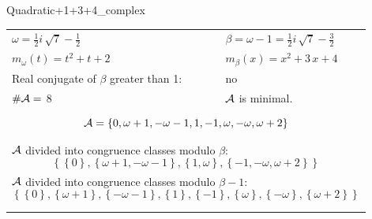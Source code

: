 \begin{exmp}
\label{ex:compareAM}

Quadratic+1+3+4\_complex

\rule{0cm}{0cm}

\begin{tabular}{ll}
$\omega=  \frac{1}{2} i \, \sqrt{7} - \frac{1}{2} $  & $\beta= \omega - 1 = \frac{1}{2} i \, \sqrt{7} - \frac{3}{2} $\\
$m_\omega(t)=  t^{2} + t + 2 $  & $m_\beta(x)=  x^{2} + 3 \, x + 4 $\\
Real conjugate of $\beta$ greater than 1:   &  no \\
$\#\mathcal{A}= $ 8 $ $ & $\mathcal{A}$ is minimal. \\
\multicolumn{2}{l}{\begin{minipage}{\textwidth}\begin{dmath*}\A = \left\{0, \omega + 1, -\omega - 1, 1, -1, \omega, -\omega, \omega + 2\right\}  \end{dmath*}\end{minipage} }\\
\multicolumn{2}{l}{\begin{minipage}{\textwidth}$\mathcal{A}$ divided into congruence classes modulo $\beta$: \begin{dmath*} \left\{\left\{0\right\}, \left\{\omega + 1, -\omega - 1\right\}, \left\{1, \omega\right\}, \left\{-1, -\omega, \omega + 2\right\}\right\}  \end{dmath*}\end{minipage} }\\[10pt]
\multicolumn{2}{l}{\begin{minipage}{\textwidth}$\mathcal{A}$ divided into congruence classes modulo $\beta-1$: \begin{dmath*} \left\{\left\{0\right\}, \left\{\omega + 1\right\}, \left\{-\omega - 1\right\}, \left\{1\right\}, \left\{-1\right\}, \left\{\omega\right\}, \left\{-\omega\right\}, \left\{\omega + 2\right\}\right\}  \end{dmath*}\end{minipage} }\\
 & \\ \hline
 & \\
\end{tabular}


\end{exmp}
